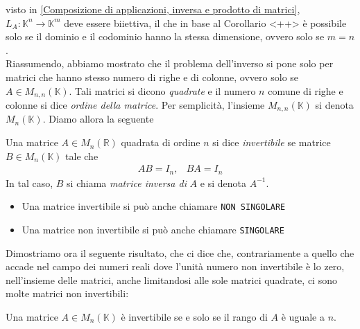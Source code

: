 visto in \ref{Composizione di applicazioni, inversa e prodotto di matrici}, $L_A:\mathbb{K}^n\to \mathbb{K}^m$
deve essere biiettiva, il che in base al Corollario <++> è possibile solo se il dominio e il codominio hanno
la stessa dimensione, ovvero solo se $m=n$.\\
Riassumendo, abbiamo mostrato che il problema dell'inverso si pone solo per matrici che hanno stesso numero di
righe e di colonne, ovvero solo se $A\in M_{n,n}(\mathbb{K})$. Tali matrici si dicono \emph{quadrate} e il
numero $n$ comune di righe e colonne si dice \emph{ordine della matrice}. Per semplicità, l'insieme $M_{n,n}
(\mathbb{K})$ si denota $M_n(\mathbb{K})$. Diamo allora la seguente
\begin{definizione}
  Una matrice $A\in M_n(\mathbb{R})$ quadrata di ordine $n$ si dice \textit{invertibile} se matrice $B\in M_n
  (\mathbb{K})$ tale che
  \begin{eqnarray}
    AB=I_n, & BA=I_n
  \end{eqnarray}
  In tal caso, $B$ si chiama \textit{matrice inversa di} $A$ e si denota $A^{-1}$.
\end{definizione}
\begin{itemize}
\item Una matrice invertibile si può anche chiamare \texttt{NON SINGOLARE}
\item Una matrice non invertibile si può anche chiamare \texttt{SINGOLARE}
\end{itemize}
\clearpage
Dimostriamo ora il seguente risultato, che ci dice che, contrariamente a quello che accade nel campo dei numeri
reali dove l'unità numero non invertibile è lo zero, nell'insieme delle matrici, anche limitandosi alle sole
matrici quadrate, ci sono molte matrici non invertibili:
\begin{teorema}
  Una matrice $A\in M_n(\mathbb{K})$ è invertibile se e solo se il rango di $A$ è uguale a $n$.
\end{teorema}
